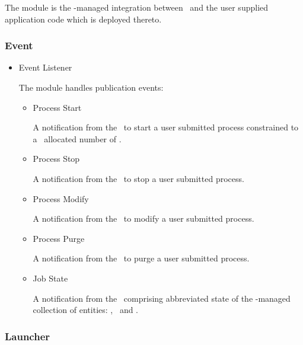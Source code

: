 \begin{itemize}
\begin{itemize}
      The module is the \varAgent-managed integration between
      \varUIMAAS~and the user supplied application code which is
      deployed thereto.
      
    \end{itemize}    
    
    \subsubsection{Event}  
    
    \begin{itemize}
      \item Event Listener
      
      The module handles publication events:
      \begin{itemize}
      \item Process Start 
      
      A notification from the \varProcessManager~to start a user submitted 
      process constrained to a \varResourceManager~allocated number of \varShares.
      
      \item Process Stop
      
      A notification from the \varProcessManager~to stop a user submitted 
      process.
      
      \item Process Modify
            
      A notification from the \varProcessManager~to modify a user submitted 
      process.
      
      \item Process Purge
                  
      A notification from the \varProcessManager~to purge a user submitted 
      process.
      
      \item Job State
                        
      A notification from the \varProcessManager~comprising abbreviated
      state of the \varDUCC-managed collection of entities: 
      \varJobs, \varReservations~and \varServices.
      
      \end{itemize}  

    \end{itemize}     
                 
    \subsubsection{Launcher}   
          

\end{itemize}
